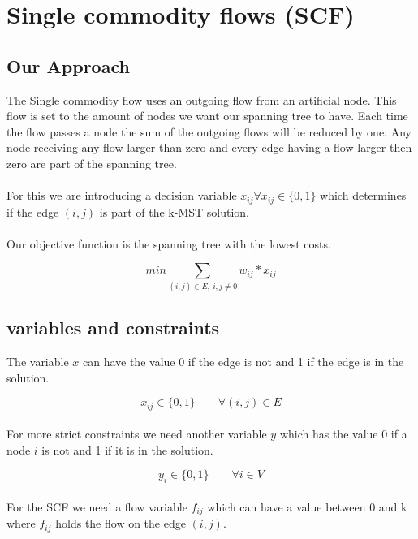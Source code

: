 \section{Single commodity flows (SCF)}

\subsection{Our Approach}
The Single commodity flow uses an outgoing flow from an artificial node. This flow is set to the amount of nodes we want our spanning tree to have. Each time the flow passes a node the sum of the outgoing flows will be reduced by one. Any node receiving any flow larger than zero and every edge having a flow larger then zero are part of the spanning tree.
\\
\\
For this we are introducing a decision variable $x_{ij} \forall x_{ij} \in \{0,1\}$ which determines if the edge $(i,j)$ is part of the k-MST solution.
\\
\\
Our objective function is the spanning tree with the lowest costs.

\begin{equation}
  min \sum_{(i,j) \in E, \ i,j \not =  0} w_{ij} * x_{ij} 
\end{equation}

\subsection{variables and constraints}

The variable $x$ can have the value 0 if the edge is not and 1 if the edge is in the solution. 

\begin{equation}
  x_{ij} \in \{0,1\} \qquad \forall (i,j) \in E
\end{equation}
\\
For more strict constraints we need another variable $y$ which has the value 0 if a node $i$ is not and 1 if it is in the solution.

\begin{equation}
  y_i \in \{0,1\} \qquad \forall i \in V
\end{equation}
\\
For the SCF we need a flow variable $f_{ij}$ which can have a value between 0 and k where $f_{ij}$ holds the flow on the edge $(i,j)$. 

